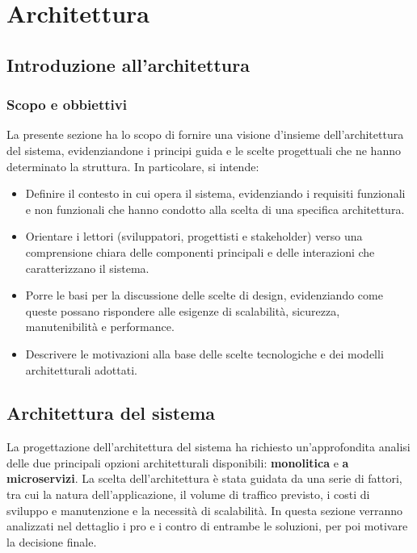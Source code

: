 \section{Architettura}

\subsection{Introduzione all’architettura}
    \subsubsection{Scopo e obbiettivi}
    La presente sezione ha lo scopo di fornire una visione d’insieme dell’architettura del sistema, evidenziandone i principi guida e le scelte progettuali che ne hanno determinato la struttura. In particolare, si intende:
    \begin{itemize}
        \item Definire il contesto in cui opera il sistema, evidenziando i requisiti funzionali e non funzionali che hanno condotto alla scelta di una specifica architettura.
        \item Orientare i lettori (sviluppatori, progettisti e stakeholder) verso una comprensione chiara delle componenti principali e delle interazioni che caratterizzano il sistema.
        \item Porre le basi per la discussione delle scelte di design, evidenziando come queste possano rispondere alle esigenze di scalabilità, sicurezza, manutenibilità e performance.
        \item Descrivere le motivazioni alla base delle scelte tecnologiche e dei modelli architetturali adottati.
    \end{itemize}




\subsection{Architettura del sistema}
La progettazione dell’architettura del sistema ha richiesto un’approfondita analisi delle due principali opzioni architetturali disponibili: \textbf{monolitica} e \textbf{a microservizi}. La scelta dell’architettura è stata guidata da una serie di fattori, tra cui la natura dell’applicazione, il volume di traffico previsto, i costi di sviluppo e manutenzione e la necessità di scalabilità. In questa sezione verranno analizzati nel dettaglio i pro e i contro di entrambe le soluzioni, per poi motivare la decisione finale.
